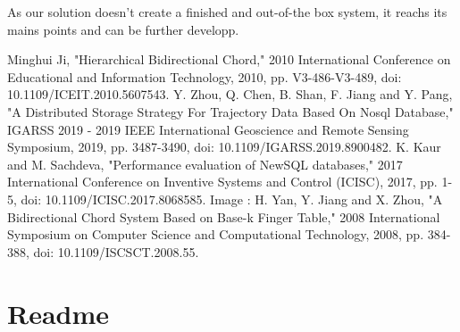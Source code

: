 \documentclass{article}
\begin{document}
As our solution doesn't create a finished and out-of-the box system, it reachs its mains points and can be further developp.


\pagebreak

\begin{thebibliography}{9}
Minghui Ji, "Hierarchical Bidirectional Chord," 2010 International Conference on Educational and Information Technology, 2010, pp. V3-486-V3-489, doi: 10.1109/ICEIT.2010.5607543.
Y. Zhou, Q. Chen, B. Shan, F. Jiang and Y. Pang, "A Distributed Storage Strategy For Trajectory Data Based On Nosql Database," IGARSS 2019 - 2019 IEEE International Geoscience and Remote Sensing Symposium, 2019, pp. 3487-3490, doi: 10.1109/IGARSS.2019.8900482.
K. Kaur and M. Sachdeva, "Performance evaluation of NewSQL databases," 2017 International Conference on Inventive Systems and Control (ICISC), 2017, pp. 1-5, doi: 10.1109/ICISC.2017.8068585.
Image : H. Yan, Y. Jiang and X. Zhou, "A Bidirectional Chord System Based on Base-k Finger Table," 2008 International Symposium on Computer Science and Computational Technology, 2008, pp. 384-388, doi: 10.1109/ISCSCT.2008.55.
\end{thebibliography}

\pagebreak

\appendix

\section{Readme}


\end{document}
